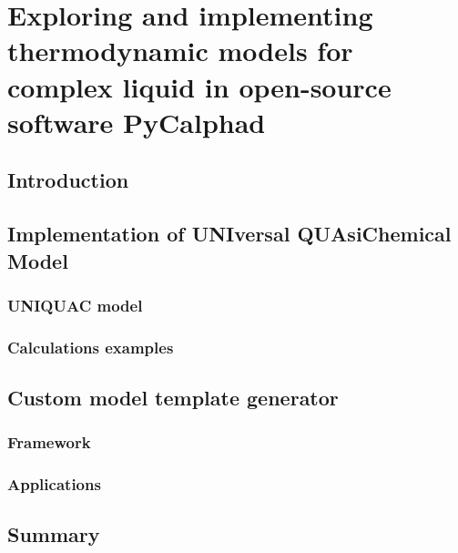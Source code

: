 \chapter{Exploring and implementing thermodynamic models for complex liquid in open-source software PyCalphad} \label{chap:models}

\section{Introduction} \label{models:sec:intro}

\section{Implementation of UNIversal QUAsiChemical Model} \label{models:sec:UNIQUAC}


\subsection{UNIQUAC model} \label{models:ssec:UNIQUACfund}


\subsection{Calculations examples} \label{models:ssec:UNIQUACexamples}


\section{Custom model template generator} \label{models:sec:CMTG}


\subsection{Framework} \label{models:ssec:CMTGframework}


\subsection{Applications} \label{models:ssec:CMTGapp}


\section{Summary} \label{models:sec:Summary}
